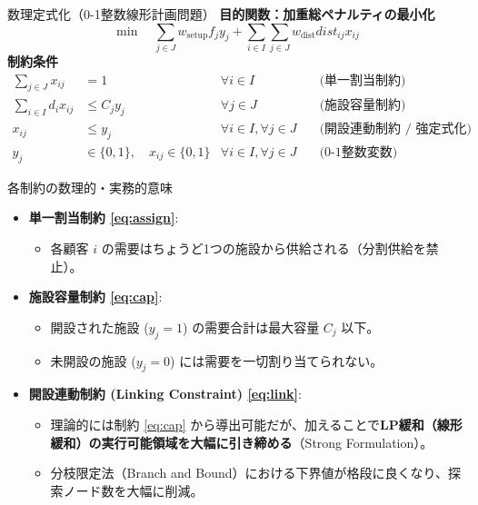 \documentclass[aspectratio=169,11pt]{beamer}
\begin{document}
\begin{frame}{数理定式化（0-1整数線形計画問題）}
  \vspace{-0.3em}
  {\small\textbf{目的関数：加重総ペナルティの最小化}}
  \vspace{-0.3em}
  \begin{equation*}
    \min \quad \sum_{j \in J} w_{\text{setup}} f_j y_j + \sum_{i \in I}\sum_{j \in J} w_{\text{dist}} dist_{ij} x_{ij}
  \end{equation*}
  \vspace{-0.5em}
  {\small\textbf{制約条件}}
  \vspace{-0.5em}
  \begin{align}
    \sum_{j \in J} x_{ij} &= 1 & \forall i \in I & \quad \text{(単一割当制約)} \label{eq:assign} \\
    \sum_{i \in I} d_i x_{ij} &\le C_j y_j & \forall j \in J & \quad \text{(施設容量制約)} \label{eq:cap} \\
    x_{ij} &\le y_j & \forall i \in I, \forall j \in J & \quad \text{(開設連動制約 / 強定式化)} \label{eq:link} \\
    y_j &\in \{0, 1\}, \quad x_{ij} \in \{0, 1\} & \forall i \in I, \forall j \in J & \quad \text{(0-1整数変数)} \nonumber
  \end{align}
\end{frame}

\begin{frame}{各制約の数理的・実務的意味}
  \begin{itemize}\small
    \item \textbf{単一割当制約 \eqref{eq:assign}}:
      \begin{itemize}\footnotesize
        \item 各顧客 $i$ の需要はちょうど1つの施設から供給される（分割供給を禁止）。
      \end{itemize}
    \item \textbf{施設容量制約 \eqref{eq:cap}}:
      \begin{itemize}\footnotesize
        \item 開設された施設 ($y_j = 1$) の需要合計は最大容量 $C_j$ 以下。
        \item 未開設の施設 ($y_j = 0$) には需要を一切割り当てられない。
      \end{itemize}
    \item \textbf{開設連動制約 (Linking Constraint) \eqref{eq:link}}:
      \begin{itemize}\footnotesize
        \item 理論的には制約 \eqref{eq:cap} から導出可能だが、加えることで\alert{\textbf{LP緩和（線形緩和）の実行可能領域を大幅に引き締める}}（Strong Formulation）。
        \item 分枝限定法（Branch and Bound）における下界値が格段に良くなり、探索ノード数を大幅に削減。
      \end{itemize}
  \end{itemize}
\end{frame}
\end{document}
